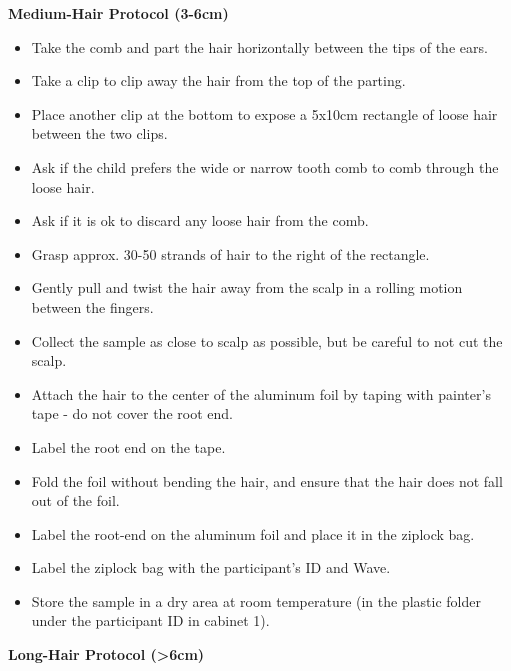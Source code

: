 \documentclass[
]{book}
\providecommand{\tightlist}{%
  \setlength{\itemsep}{0pt}\setlength{\parskip}{0pt}}
\begin{document}
\textbf{Medium-Hair Protocol (3-6cm)}

\begin{itemize}
\tightlist
\item
  Take the comb and part the hair horizontally between the tips of the ears.
\item
  Take a clip to clip away the hair from the top of the parting.
\item
  Place another clip at the bottom to expose a 5x10cm rectangle of loose hair between the two clips.
\item
  Ask if the child prefers the wide or narrow tooth comb to comb through the loose hair.
\item
  Ask if it is ok to discard any loose hair from the comb.
\item
  Grasp approx. 30-50 strands of hair to the right of the rectangle.
\item
  Gently pull and twist the hair away from the scalp in a rolling motion between the fingers.
\item
  Collect the sample as close to scalp as possible, but be careful to not cut the scalp.
\item
  Attach the hair to the center of the aluminum foil by taping with painter's tape - do not cover the root end.
\item
  Label the root end on the tape.
\item
  Fold the foil without bending the hair, and ensure that the hair does not fall out of the foil.
\item
  Label the root-end on the aluminum foil and place it in the ziplock bag.
\item
  Label the ziplock bag with the participant's ID and Wave.
\item
  Store the sample in a dry area at room temperature (in the plastic folder under the participant ID in cabinet 1).
\end{itemize}

\textbf{Long-Hair Protocol (\textgreater6cm)}
\end{document}
